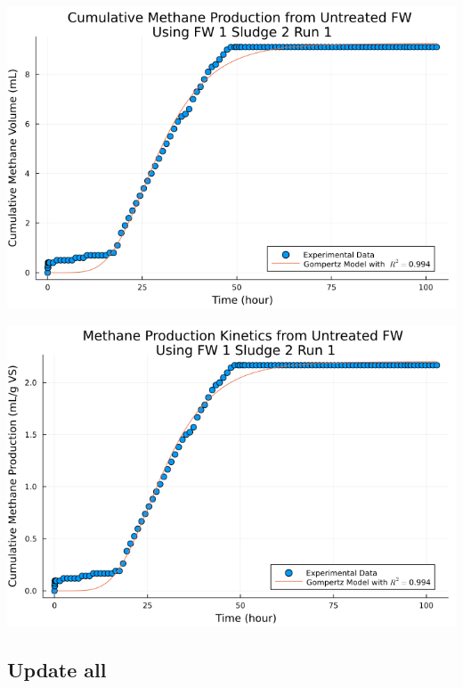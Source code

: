 \documentclass[11pt]{article}
\begin{document}
\begin{center}
\includegraphics[width=.9\linewidth]{../plots/BMPs/Untreated FW/methane_kinetics_untreated_fw_s2_r1_hour.png}
\end{center}

\begin{center}
\includegraphics[width=.9\linewidth]{../plots/BMPs/Untreated FW/specific_methane_kinetics_untreated_fw_s2_r1_hour.png}
\end{center}

\subsection{Update all}
\label{sec:orgf1c0329}
\end{document}
